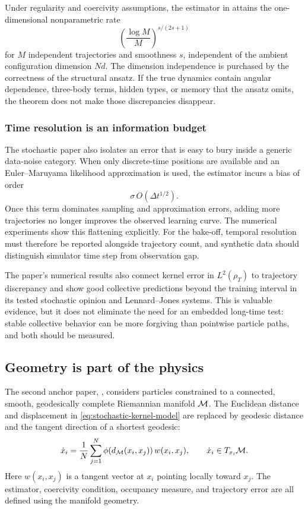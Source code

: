 Under regularity and coercivity assumptions, the estimator in \citet{lu2022stochasticinteractions} attains the one-dimensional nonparametric rate
\begin{equation}
\left(\frac{\log M}{M}\right)^{s/(2s+1)}
\end{equation}
for \(M\) independent trajectories and smoothness \(s\), independent of the ambient configuration dimension \(Nd\). The dimension independence is purchased by the correctness of the structural ansatz. If the true dynamics contain angular dependence, three-body terms, hidden types, or memory that the ansatz omits, the theorem does not make those discrepancies disappear.

\subsubsection{Time resolution is an information budget}

The stochastic paper also isolates an error that is easy to bury inside a generic data-noise category. When only discrete-time positions are available and an Euler--Maruyama likelihood approximation is used, the estimator incurs a bias of order
\begin{equation}
\sigma\,O(\Delta t^{1/2}).
\end{equation}
Once this term dominates sampling and approximation errors, adding more trajectories no longer improves the observed learning curve. The numerical experiments show this flattening explicitly. For the bake-off, temporal resolution must therefore be reported alongside trajectory count, and synthetic data should distinguish simulator time step from observation gap.

The paper's numerical results also connect kernel error in \(L^2(\rho_T)\) to trajectory discrepancy and show good collective predictions beyond the training interval in its tested stochastic opinion and Lennard--Jones systems. This is valuable evidence, but it does not eliminate the need for an embedded long-time test: stable collective behavior can be more forgiving than pointwise particle paths, and both should be measured.

\subsection{Geometry is part of the physics}

The second anchor paper, \citet{maggioni2021manifold}, considers particles constrained to a connected, smooth, geodesically complete Riemannian manifold \(\mathcal{M}\). The Euclidean distance and displacement in \cref{eq:stochastic-kernel-model} are replaced by geodesic distance and the tangent direction of a shortest geodesic:
\begin{equation}
\dot x_i
=
\frac{1}{N}\sum_{j=1}^{N}
\phi\!\left(d_{\mathcal{M}}(x_i,x_j)\right)
w(x_i,x_j),
\qquad
\dot x_i\in T_{x_i}\mathcal{M} .
\label{eq:manifold-kernel}
\end{equation}
Here \(w(x_i,x_j)\) is a tangent vector at \(x_i\) pointing locally toward \(x_j\). The estimator, coercivity condition, occupancy measure, and trajectory error are all defined using the manifold geometry.

